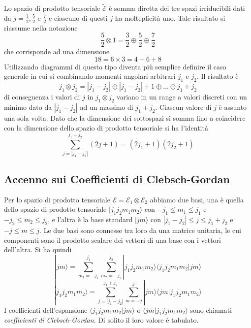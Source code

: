 Lo spazio di prodotto tensoriale $\mathcal{\tilde{E}}$ \`e somma diretta dei tre spazi irriducibili dati da $j = \frac{3}{2},\frac{5}{2}$ e $\frac{7}{2}$ e ciascuno di questi $j$ ha molteplicit\`a uno. Tale risultato si riassume nella notazione
\begin{equation*}
	\frac{5}{2} \otimes 1 = \frac{3}{2} \oplus \frac{5}{2} \oplus \frac{7}{2}
\end{equation*}
che corrisponde ad una dimensione
\begin{equation*}
	18 = 6 \times 3 = 4 + 6 + 8
\end{equation*}
Utilizzando diagrammi di questo tipo diventa pi\`u semplice definire il caso generale in cui si combinando momenti angolari arbitrari $j_1$ e $j_2$. Il risultato \`e 
\begin{equation*}
	j_1 \otimes j_2 = |j_1 -j_2| \oplus |j_1-j_2| +1 \oplus \ldots \oplus j_1+j_2
\end{equation*}
di conseguenza i valori di $j$ in $j_1 \otimes j_2$ variano in un range a valori discreti con un minimo dato da $|j_1-j_2|$ ad un massimo di $j_1 +j_2$. Ciascun valore di $j$ \`e assunto una sola volta. Dato che la dimensione dei sottospazi si somma fino a coincidere con la dimensione dello spazio di prodotto tensoriale si ha l'identit\`a
\begin{equation*}
	\sum_{j = |j_1-j_2|}^{j_1+j_2}(2j+1) = (2j_1+1)(2j_2+1)
\end{equation*}

\subsection{Accenno sui Coefficienti di Clebsch-Gordan}

Per lo spazio di prodotto tensoriale $\mathcal{E} = \mathcal{E}_1 \otimes \mathcal{E}_2$ abbiamo due basi, una \`e quella dello spazio di prodotto tensoriale $|j_1j_2m_1m_2 \rangle$ con $-j_1 \leq m_1 \leq j_1$ e $-j_2 \leq m_2 \leq j_2$,  e l'altra \`e la base standard $|jm \rangle$ con $|j_1-j_2| \leq j \leq j_1 +j_2$ e $-j \leq m \leq j$. Le due basi sono connesse tra loro da una matrice unitaria, le cui componenti sono il prodotto scalare dei vettori di una base con i vettori dell'altra. Si ha quindi 
\begin{equation*}
	|jm \rangle = \sum_{m_1 = -j_1}^{j_1}\sum_{m_2 = -j_2}^{j_2}|j_1j_2m_1m_2 \rangle \langle j_1 j_2m_1m_2 |jm\rangle
\end{equation*}
\newpage
\begin{equation*}
	|j_1j_2m_1m_2\rangle = \sum_{j = |j_1-j_2|}^{j_1+j_2}\sum_{m=-j}^{j}|jm \rangle \langle jm|j_1j_2m_1m_2 \rangle
\end{equation*}
I coefficienti dell'espansione $\langle j_1j_2m_1m_2|jm\rangle$ o $\langle jm|j_1j_2m_1m_2 \rangle$ sono chiamati \textit{coefficienti di Clebsch-Gordan}. Di solito il loro valore \`e tabulato.

